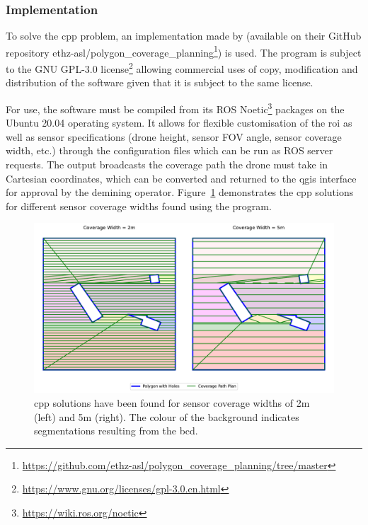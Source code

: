 \subsubsection{Implementation}

To solve the \gls{cpp} problem, an implementation made by \cite{bahnemann2021cpp} (available on their GitHub repository ethz-asl/polygon\_coverage\_planning\footnote{\url{https://github.com/ethz-asl/polygon_coverage_planning/tree/master}}) is used. The program is subject to the GNU GPL-3.0 license\footnote{\url{https://www.gnu.org/licenses/gpl-3.0.en.html}} allowing commercial uses of copy, modification and distribution of the software given that it is subject to the same license. 

For use, the software must be compiled from its ROS Noetic\footnote{\url{https://wiki.ros.org/noetic}} packages on the Ubuntu 20.04 operating system. It allows for flexible customisation of the \gls{roi} as well as sensor specifications (drone height, sensor FOV angle, sensor coverage width, etc.) through the configuration files which can be run as ROS server requests. The output broadcasts the coverage path the drone must take in Cartesian coordinates, which can be converted and returned to the \gls{qgis} interface for approval by the demining operator. Figure~\ref{fig:msp_bahnemann} demonstrates the \gls{cpp} solutions for different sensor coverage widths found using the program. 

\begin{figure}[h!]
    \centering
    \includegraphics[width=\linewidth]{figs/Jihwan/CPP_diff_widths.pdf}
    \caption[CPP Solution Examples]
    {\gls{cpp} solutions have been found for sensor coverage widths of 2m (left) and 5m (right). The colour of the background indicates segmentations resulting from the \gls{bcd}.}
    \label{fig:msp_bahnemann}
\end{figure}

